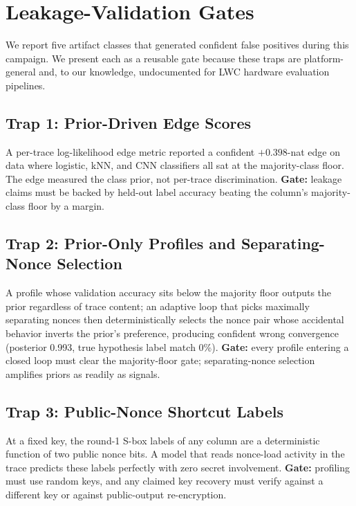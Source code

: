 \documentclass[conference]{IEEEtran}
\begin{document}
\section{Leakage-Validation Gates}
\label{sec:gates}

We report five artifact classes that generated confident false
positives during this campaign. We present each as a reusable
gate because these traps are platform-general and, to our
knowledge, undocumented for LWC hardware evaluation pipelines.

\subsection{Trap 1: Prior-Driven Edge Scores}

A per-trace log-likelihood edge metric reported a confident
$+0.398$-nat edge on data where logistic, kNN, and CNN
classifiers all sat at the majority-class floor. The edge
measured the class prior, not per-trace discrimination.
\textbf{Gate:} leakage claims must be backed by held-out label
accuracy beating the column's majority-class floor by a margin.

\subsection{Trap 2: Prior-Only Profiles and Separating-Nonce
Selection}

A profile whose validation accuracy sits below the majority
floor outputs the prior regardless of trace content; an
adaptive loop that picks maximally separating nonces then
deterministically selects the nonce pair whose accidental
behavior inverts the prior's preference, producing confident
wrong convergence (posterior 0.993, true hypothesis label match
0\%). \textbf{Gate:} every profile entering a closed loop must
clear the majority-floor gate; separating-nonce selection
amplifies priors as readily as signals.

\subsection{Trap 3: Public-Nonce Shortcut Labels}

At a fixed key, the round-1 S-box labels of any column are a
deterministic function of two public nonce bits. A model that
reads nonce-load activity in the trace predicts these labels
perfectly with zero secret involvement. \textbf{Gate:}
profiling must use random keys, and any claimed key recovery
must verify against a different key or against public-output
re-encryption.
\end{document}
